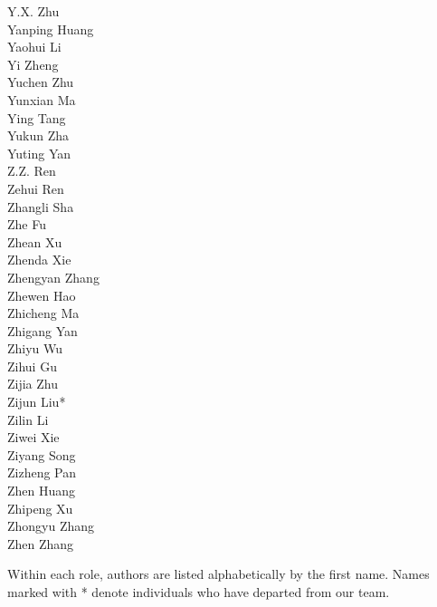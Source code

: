 \documentclass[11pt, a4paper, logo, copyright, nonumbering]{deepseek}
\begin{document}
\begin{multicols}{2}
\color{damaiblue} Y.X. Zhu \\
\color{damaiblue} Yanping Huang \\
\color{damaiblue} Yaohui Li \\
\color{damaiblue} Yi Zheng \\
\color{damaiblue} Yuchen Zhu \\
\color{damaiblue} Yunxian Ma \\
\color{damaiblue} Ying Tang \\
\color{damaiblue} Yukun Zha \\
\color{damaiblue} Yuting Yan \\
\color{damaiblue} Z.Z. Ren \\
\color{damaiblue} Zehui Ren \\
\color{damaiblue} Zhangli Sha \\
\color{damaiblue} Zhe Fu \\
\color{damaiblue} Zhean Xu \\
\color{damaiblue} Zhenda Xie \\
\color{damaiblue} Zhengyan Zhang \\
\color{damaiblue} Zhewen Hao \\
\color{damaiblue} Zhicheng Ma \\
\color{damaiblue} Zhigang Yan \\
\color{damaiblue} Zhiyu Wu \\
\color{damaiblue} Zihui Gu \\
\color{damaiblue} Zijia Zhu \\
\color{damaiblue} Zijun Liu* \\
\color{damaiblue} Zilin Li \\
\color{damaiblue} Ziwei Xie \\
\color{damaiblue} Ziyang Song \\
\color{damaiblue} Zizheng Pan \\
\color{damaiblue} Zhen Huang \\
\color{damaiblue} Zhipeng Xu \\
\color{damaiblue} Zhongyu Zhang \\
\color{damaiblue} Zhen Zhang \\

\end{multicols} %

Within each role, authors are listed alphabetically by the first name. 
Names marked with * denote individuals who have departed from our team. 


\setcounter{figure}{0}
\makeatletter 
\renewcommand{\thefigure}{A\@arabic\c@figure}
\makeatother

\setcounter{table}{0}
\makeatletter 
\renewcommand{\thetable}{A\@arabic\c@table}
\makeatother
\end{document}

